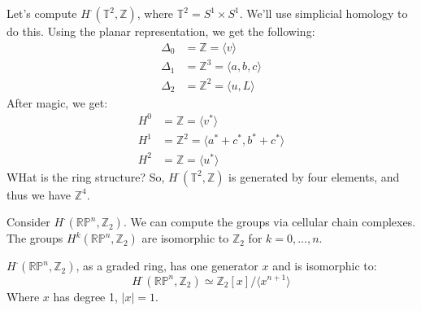 \documentclass{book}                                                           %
\begin{document}
            \begin{example}
                Let's compute $H^{\cdot}(\mathbb{T}^{2},\mathbb{Z})$,
                where $\mathbb{T}^{2}=S^{1}\times{S}^{1}$. We'll use
                simplicial homology to do this. Using the planar
                representation, we get the following:
                \begin{subequations}
                    \begin{align}
                        \Delta_{0}&=\mathbb{Z}
                            =\langle{v}\rangle\\
                        \Delta_{1}&=\mathbb{Z}^{3}
                            =\langle{a,b,c}\rangle\\
                        \Delta_{2}&=\mathbb{Z}^{2}
                            =\langle{u,L}\rangle
                    \end{align}
                \end{subequations}
                After magic, we get:
                \begin{subequations}
                    \begin{align}
                        H^{0}&=\mathbb{Z}
                            =\langle{v^{*}}\rangle\\
                        H^{1}&=\mathbb{Z}^{2}
                            =\langle{a^{*}+c^{*},b^{*}+c^{*}}\rangle\\
                        H^{2}&=\mathbb{Z}
                            =\langle{u^{*}}\rangle
                    \end{align}
                \end{subequations}
                WHat is the ring structure? So,
                $H^{\cdot}(\mathbb{T}^{2},\mathbb{Z})$ is generated by
                four elements, and thus we have $\mathbb{Z}^{4}$.
            \end{example}
            \begin{example}
                Consider $H^{\cdot}(\mathbb{RP}^{n},\mathbb{Z}_{2})$.
                We can compute the groups via cellular chain complexes.
                The groups $H^{k}(\mathbb{RP}^{n},\mathbb{Z}_{2})$ are
                isomorphic to $\mathbb{Z}_{2}$ for $k=0,\dots,n$.
            \end{example}
            \begin{theorem}
                $H^{\cdot}(\mathbb{RP}^{n},\mathbb{Z}_{2})$, as a
                graded ring, has one generator $x$ and is isomorphic
                to:
                \begin{equation}
                    H^{\cdot}(\mathbb{RP}^{n},\mathbb{Z}_{2})
                    \simeq\mathbb{Z}_{2}[x]/\langle{x^{n+1}}\rangle
                \end{equation}
                Where $x$ has degree 1, $|x|=1$.
            \end{theorem}
\end{document}
